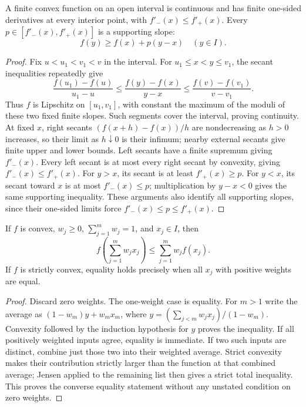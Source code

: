 \begin{theorem}
A finite convex function on an open interval is continuous and has finite one-sided derivatives at every interior point, with $f'_-(x)\le f'_+(x)$. Every $p\in[f'_-(x),f'_+(x)]$ is a supporting slope:
\[ f(y)\ge f(x)+p(y-x)\quad(y\in I). \]
\end{theorem}
\begin{proof}
Fix $u<u_1<v_1<v$ in the interval. For $u_1\le x<y\le v_1$, the secant inequalities repeatedly give
\[ \frac{f(u_1)-f(u)}{u_1-u}\le\frac{f(y)-f(x)}{y-x}\le\frac{f(v)-f(v_1)}{v-v_1}. \]
Thus $f$ is Lipschitz on $[u_1,v_1]$, with constant the maximum of the moduli of these two fixed finite slopes. Such segments cover the interval, proving continuity. At fixed $x$, right secants $(f(x+h)-f(x))/h$ are nondecreasing as $h>0$ increases, so their limit as $h\downarrow0$ is their infimum; nearby external secants give finite upper and lower bounds. Left secants have a finite supremum giving $f'_-(x)$. Every left secant is at most every right secant by convexity, giving $f'_-(x)\le f'_+(x)$. For $y>x$, its secant is at least $f'_+(x)\ge p$. For $y<x$, its secant toward $x$ is at most $f'_-(x)\le p$; multiplication by $y-x<0$ gives the same supporting inequality. These arguments also identify all supporting slopes, since their one-sided limits force $f'_-(x)\le p\le f'_+(x)$.
\end{proof}

\begin{theorem}
If $f$ is convex, $w_j\ge0$, $\sum_{j=1}^m w_j=1$, and $x_j\in I$, then
\[ f\left(\sum_{j=1}^m w_jx_j\right)\le\sum_{j=1}^m w_jf(x_j). \]
If $f$ is strictly convex, equality holds precisely when all $x_j$ with positive weights are equal.
\end{theorem}
\begin{proof}
Discard zero weights. The one-weight case is equality. For $m>1$ write the average as $(1-w_m)y+w_mx_m$, where $y=(\sum_{j<m}w_jx_j)/(1-w_m)$. Convexity followed by the induction hypothesis for $y$ proves the inequality. If all positively weighted inputs agree, equality is immediate. If two such inputs are distinct, combine just those two into their weighted average. Strict convexity makes their contribution strictly larger than the function at that combined average; Jensen applied to the remaining list then gives a strict total inequality. This proves the converse equality statement without any unstated condition on zero weights.
\end{proof}

